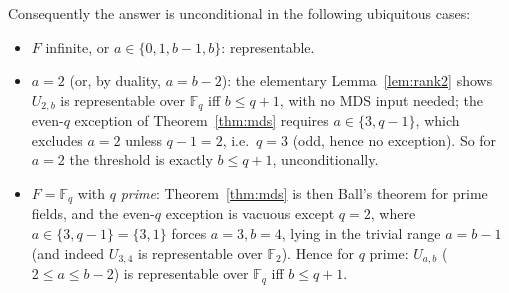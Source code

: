 \documentclass{amsart}
\theoremstyle{definition}
\begin{document}
Consequently the answer is unconditional in the following ubiquitous cases:
\begin{itemize}
\item $F$ infinite, or $a\in\{0,1,b-1,b\}$: representable.
\item $a=2$ (or, by duality, $a=b-2$): the elementary
Lemma~\ref{lem:rank2} shows $U_{2,b}$ is representable over $\mathbb F_q$ iff
$b\le q+1$, with no MDS input needed; the even-$q$ exception of
Theorem~\ref{thm:mds} requires $a\in\{3,q-1\}$, which excludes $a=2$ unless
$q-1=2$, i.e.\ $q=3$ (odd, hence no exception). So for $a=2$ the threshold is
exactly $b\le q+1$, unconditionally.
\item $F=\mathbb F_q$ with $q$ \emph{prime}: Theorem~\ref{thm:mds} is then Ball's
theorem for prime fields, and the even-$q$ exception is vacuous except $q=2$,
where $a\in\{3,q-1\}=\{3,1\}$ forces $a=3,b=4$, lying in the trivial range
$a=b-1$ (and indeed $U_{3,4}$ is representable over $\mathbb F_2$). Hence for $q$
prime: $U_{a,b}$ ($2\le a\le b-2$) is representable over $\mathbb F_q$ iff
$b\le q+1$.
\end{itemize}
\end{document}
